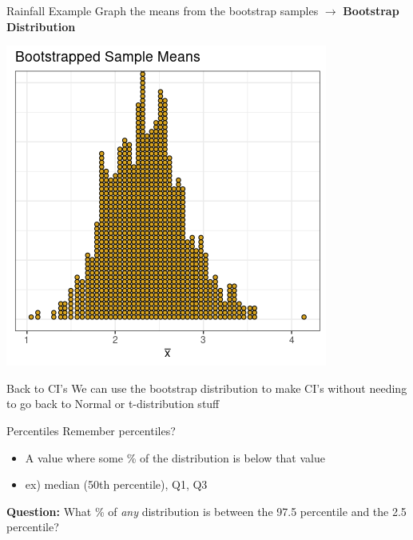 \documentclass{beamer}
\begin{document}
\begin{frame}{Rainfall Example}
Graph the means from the bootstrap samples $\rightarrow$ \textbf{Bootstrap Distribution}
\begin{center}
\includegraphics[scale=0.65]{img/mean_bootstrap2.png}
\end{center}
\end{frame}

\begin{frame}{Back to CI's}
We can use the bootstrap distribution to make CI's without needing to go back to Normal or t-distribution stuff
\end{frame}

\begin{frame}{Percentiles}
Remember percentiles?
\begin{itemize}
    \item A value where some \% of the distribution is below that value
    \item ex) median (50th percentile), Q1, Q3
\end{itemize} \vspace{8mm}

\textbf{Question:} What \% of \textit{any} distribution is between the 97.5 percentile and the 2.5 percentile?
\end{frame}
\end{document}
